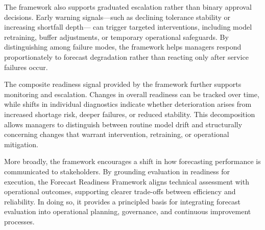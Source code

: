 The framework also supports graduated escalation rather than binary approval decisions.
Early warning signals—such as declining tolerance stability or increasing shortfall depth—
can trigger targeted interventions, including model retraining, buffer adjustments, or
temporary operational safeguards. By distinguishing among failure modes, the framework
helps managers respond proportionately to forecast degradation rather than reacting only
after service failures occur.

The composite readiness signal provided by the framework further supports monitoring and
escalation. Changes in overall readiness can be tracked over time, while shifts in individual
diagnostics indicate whether deterioration arises from increased shortage risk, deeper failures,
or reduced stability. This decomposition allows managers to distinguish between routine model
drift and structurally concerning changes that warrant intervention, retraining, or operational
mitigation.

More broadly, the framework encourages a shift in how forecasting performance is communicated
to stakeholders. By grounding evaluation in readiness for execution, the Forecast Readiness
Framework aligns technical assessment with operational outcomes, supporting clearer trade-offs
between efficiency and reliability. In doing so, it provides a principled basis for integrating
forecast evaluation into operational planning, governance, and continuous improvement
processes.
